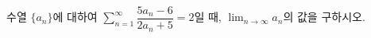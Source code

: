 수열 $\{a_n\}$에 대하여 $\displaystyle\sum_{n=1}^{\infty}\dfrac{5a_n-6}{2a_n+5}=2$일 때, $\displaystyle\lim_{n\to\infty} a_n$의 값을 구하시오.
